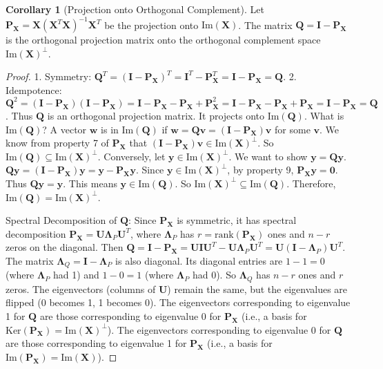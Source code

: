\documentclass[12pt, letterpaper]{article}
\theoremstyle{definition}
\newtheorem{corollary}{Corollary}[section]
\newcommand{\mat}[1]{\mathbf{#1}} %
\newcommand{\vect}[1]{\mathbf{#1}} %
\renewcommand{\v}{\vect{v}} %
\newcommand{\y}{\vect{y}} %
\newcommand{\w}{\vect{w}} %
\newcommand{\im}{\text{Im}}
\newcommand{\Ker}{\text{Ker}}
\newcommand{\rank}{\text{rank}}
\begin{document}
\begin{corollary}[Projection onto Orthogonal Complement]
Let $\mat{P}_\mat{X} = \mat{X}(\mat{X}^T \mat{X})^{-1} \mat{X}^T$ be the projection onto $\im(\mat{X})$. The matrix $\mat{Q} = \mat{I} - \mat{P}_\mat{X}$ is the orthogonal projection matrix onto the orthogonal complement space $\im(\mat{X})^\perp$.
\end{corollary}
\begin{proof}
1. Symmetry: $\mat{Q}^T = (\mat{I} - \mat{P}_\mat{X})^T = \mat{I}^T - \mat{P}_\mat{X}^T = \mat{I} - \mat{P}_\mat{X} = \mat{Q}$.
2. Idempotence: $\mat{Q}^2 = (\mat{I} - \mat{P}_\mat{X})(\mat{I} - \mat{P}_\mat{X}) = \mat{I} - \mat{P}_\mat{X} - \mat{P}_\mat{X} + \mat{P}_\mat{X}^2 = \mat{I} - \mat{P}_\mat{X} - \mat{P}_\mat{X} + \mat{P}_\mat{X} = \mat{I} - \mat{P}_\mat{X} = \mat{Q}$.
Thus $\mat{Q}$ is an orthogonal projection matrix. It projects onto $\im(\mat{Q})$. What is $\im(\mat{Q})$?
A vector $\w$ is in $\im(\mat{Q})$ if $\w = \mat{Q}\v = (\mat{I} - \mat{P}_\mat{X})\v$ for some $\v$. We know from property 7 of $\mat{P}_\mat{X}$ that $(\mat{I} - \mat{P}_\mat{X})\v \in \im(\mat{X})^\perp$. So $\im(\mat{Q}) \subseteq \im(\mat{X})^\perp$.
Conversely, let $\y \in \im(\mat{X})^\perp$. We want to show $\y = \mat{Q}\y$.
$\mat{Q}\y = (\mat{I} - \mat{P}_\mat{X})\y = \y - \mat{P}_\mat{X}\y$. Since $\y \in \im(\mat{X})^\perp$, by property 9, $\mat{P}_\mat{X}\y = \vect{0}$. Thus $\mat{Q}\y = \y$. This means $\y \in \im(\mat{Q})$. So $\im(\mat{X})^\perp \subseteq \im(\mat{Q})$.
Therefore, $\im(\mat{Q}) = \im(\mat{X})^\perp$.

Spectral Decomposition of $\mat{Q}$: Since $\mat{P}_\mat{X}$ is symmetric, it has spectral decomposition $\mat{P}_\mat{X} = \mat{U} \mat{\Lambda}_P \mat{U}^T$, where $\mat{\Lambda}_P$ has $r = \rank(\mat{P}_\mat{X})$ ones and $n-r$ zeros on the diagonal.
Then $\mat{Q} = \mat{I} - \mat{P}_\mat{X} = \mat{U}\mat{I}\mat{U}^T - \mat{U}\mat{\Lambda}_P\mat{U}^T = \mat{U}(\mat{I} - \mat{\Lambda}_P)\mat{U}^T$.
The matrix $\mat{\Lambda}_Q = \mat{I} - \mat{\Lambda}_P$ is also diagonal. Its diagonal entries are $1-1=0$ (where $\mat{\Lambda}_P$ had 1) and $1-0=1$ (where $\mat{\Lambda}_P$ had 0). So $\mat{\Lambda}_Q$ has $n-r$ ones and $r$ zeros.
The eigenvectors (columns of $\mat{U}$) remain the same, but the eigenvalues are flipped (0 becomes 1, 1 becomes 0). The eigenvectors corresponding to eigenvalue 1 for $\mat{Q}$ are those corresponding to eigenvalue 0 for $\mat{P}_\mat{X}$ (i.e., a basis for $\Ker(\mat{P}_\mat{X}) = \im(\mat{X})^\perp$). The eigenvectors corresponding to eigenvalue 0 for $\mat{Q}$ are those corresponding to eigenvalue 1 for $\mat{P}_\mat{X}$ (i.e., a basis for $\im(\mat{P}_\mat{X}) = \im(\mat{X})$).
\end{proof}
\end{document}
